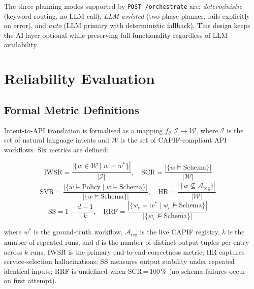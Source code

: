 \documentclass[conference]{IEEEtran}
\begin{document}
The three planning modes supported by \texttt{POST /orchestrate} are:
\textit{deterministic} (keyword routing, no LLM call),
\textit{LLM-assisted} (two-phase planner, fails explicitly on error), and
\textit{auto} (LLM primary with deterministic fallback).
This design keeps the AI layer optional while preserving full
functionality regardless of LLM availability.

\section{Reliability Evaluation}
\label{sec:eval}

\subsection{Formal Metric Definitions}

Intent-to-API translation is formalised as a mapping
$f_\theta : \mathcal{I} \rightarrow \mathcal{W}$,
where $\mathcal{I}$ is the set of natural language intents and
$\mathcal{W}$ is the set of CAPIF-compliant API workflows.
Six metrics are defined:

\begin{equation}
\text{IWSR} = \frac{|\{w \in \mathcal{W} \mid w = w^*\}|}{|\mathcal{I}|}, \quad
\text{SCR} = \frac{|\{w \models \text{Schema}\}|}{|\mathcal{W}|}
\end{equation}
\begin{equation}
\text{SVR} = \frac{|\{w \models \text{Policy} \mid w \models \text{Schema}\}|}{|\{w \models \text{Schema}\}|}, \quad
\text{HR} = \frac{|\{w \not\subseteq \mathcal{A}_{\text{reg}}\}|}{|\mathcal{W}|}
\end{equation}
\begin{equation}
\text{SS} = 1 - \frac{d-1}{k}, \quad
\text{RRF} = \frac{|\{w_c = w^* \mid w_i \not\models \text{Schema}\}|}{|\{w_i \not\models \text{Schema}\}|}
\end{equation}

where $w^*$ is the ground-truth workflow, $\mathcal{A}_{\text{reg}}$
is the live CAPIF registry, $k$ is the number of repeated runs,
and $d$ is the number of distinct output tuples per entry across $k$ runs.
IWSR is the primary end-to-end correctness metric; HR captures
service-selection hallucinations; SS measures output stability
under repeated identical inputs; RRF is undefined when SCR\,=\,100\,\%
(no schema failures occur on first attempt).
\end{document}
